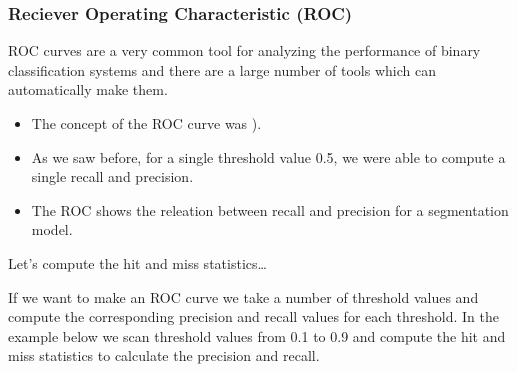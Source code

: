 \documentclass[letterpaper,10pt,english]{sphinxmanual}
\begin{document}
\subsubsection{Reciever Operating Characteristic (ROC)}
\label{\detokenize{04-BasicSegmentation_Part2:reciever-operating-characteristic-roc}}
\sphinxAtStartPar
ROC curves are a very common tool for analyzing the performance of binary classification systems and there are a large number of tools which can automatically make them.
\begin{itemize}
\item {} 
\sphinxAtStartPar
The concept of the ROC curve was ).

\item {} 
\sphinxAtStartPar
As we saw before, for a single threshold value 0.5, we were able to compute a single recall and precision.

\item {} 
\sphinxAtStartPar
The ROC shows the releation between recall and precision for a segmentation model.

\end{itemize}

\sphinxAtStartPar
Let’s compute the hit and miss statistics…

\sphinxAtStartPar
If we want to make an ROC curve we take a number of threshold values and compute the corresponding precision and recall values for each threshold.  In the example below we scan threshold values from 0.1 to 0.9 and compute the hit and miss statistics to calculate the precision and recall.
\end{document}
